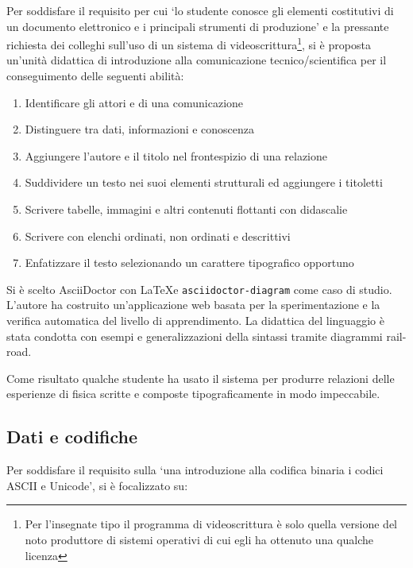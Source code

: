 \documentclass{easychair}
\begin{document}
Per soddisfare il requisito per cui `lo studente conosce gli elementi costitutivi
di un documento elettronico e i principali strumenti di produzione' e la
pressante richiesta dei colleghi sull'uso di un sistema di videoscrittura\footnote{Per
l'insegnate tipo il programma di videoscrittura è solo quella versione del noto produttore
di sistemi operativi di cui egli ha ottenuto una qualche licenza}, si è proposta un'unità
didattica di introduzione alla comunicazione tecnico/scientifica per il conseguimento
delle seguenti abilità:

\begin{enumerate}
\item
  Identificare gli attori e di una comunicazione
\item
  Distinguere tra dati, informazioni e conoscenza
\item
  Aggiungere l'autore e il titolo nel frontespizio di una relazione
\item
  Suddividere un testo nei suoi elementi strutturali ed aggiungere i
  titoletti
\item
  Scrivere tabelle, immagini e altri contenuti flottanti con didascalie
\item
  Scrivere con elenchi ordinati, non ordinati e descrittivi
\item
  Enfatizzare il testo selezionando un carattere tipografico opportuno
\end{enumerate}

Si è scelto AsciiDoctor\cite{asciidoctor} con \LaTeX e \texttt{asciidoctor-diagram} come caso di studio.
L'autore ha costruito un'applicazione web basata per
la sperimentazione e la verifica automatica del livello di apprendimento.
La didattica del linguaggio è stata condotta con esempi e generalizzazioni
della sintassi tramite diagrammi rail-road.

Come risultato qualche studente ha usato il sistema per produrre
relazioni delle esperienze di fisica scritte e composte tipograficamente
in modo impeccabile.

\subsection[Dati e codifiche]{Dati e codifiche} 

Per soddisfare il requisito sulla `\textellipsis una introduzione alla codifica binaria
\textellipsis i codici ASCII e Unicode', si è focalizzato su:
\end{document}
